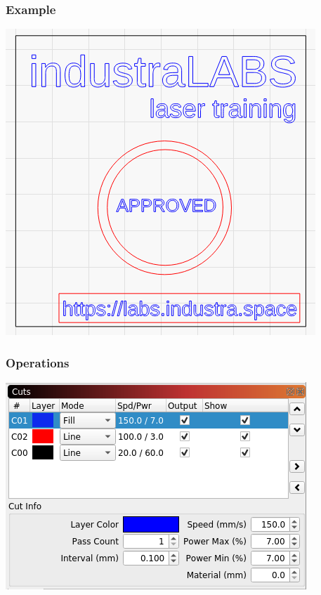 \documentclass[14pt]{beamer}
\begin{document}
\begin{frame}
\frametitle{Example}
\centering
\includegraphics[scale=0.5]{imgs/lb_example.png}

\end{frame}


\begin{frame}
\frametitle{Operations}
\centering
\includegraphics[scale=0.7]{imgs/lb_colors.png}

\end{frame}
\end{document}
